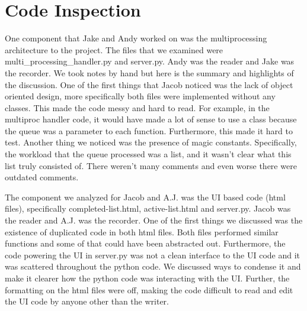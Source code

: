 \documentclass{article}
\begin{document}
\section{Code Inspection}
One component that Jake and Andy worked on was the multiprocessing architecture to the project. The files that we examined were multi\_processing\_handler.py and server.py. Andy was the reader and Jake was the recorder. We took notes by hand but here is the summary and highlights of the discussion. One of the first things that Jacob noticed was the lack of object oriented design, more specifically both files were implemented without any classes. This made the code messy and hard to read. For example, in the multiproc handler code, it would have made a lot of sense to use a class because the queue was a parameter to each function. Furthermore, this made it hard to test. Another thing we noticed was the presence of magic constants. Specifically, the workload that the queue processed was a list, and it wasn't clear what this list truly consisted of. There weren't many comments and even worse there were outdated comments.

The component we analyzed for Jacob and A.J. was the UI based code (html files), specifically completed-list.html, active-list.html and server.py. Jacob was the reader and A.J. was the recorder. One of the first things we discussed was the existence of duplicated code in both html files. Both files performed similar functions and some of that could have been abstracted out. Furthermore, the code powering the UI in server.py was not a clean interface to the UI code and it was scattered throughout the python code. We discussed ways to condense it and make it clearer how the python code was interacting with the UI. Further, the formatting on the html files were off, making the code difficult to read and edit the UI code by anyone other than the writer.
\end{document}
